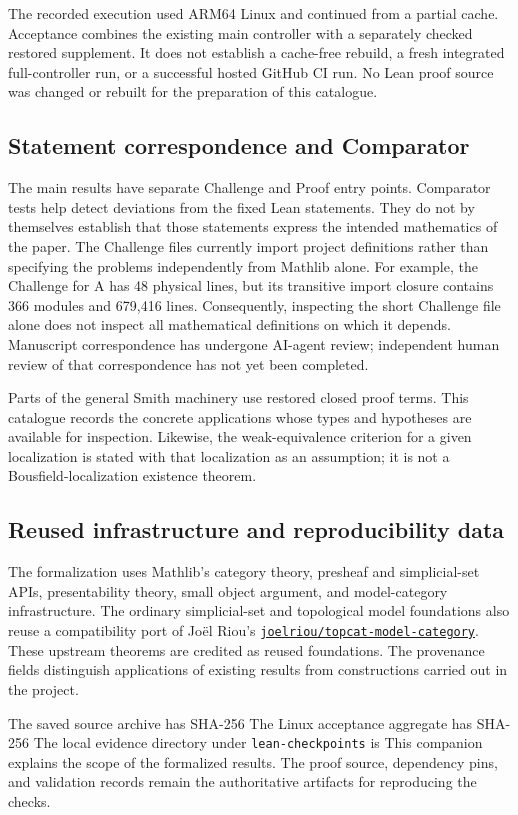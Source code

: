 The recorded execution used ARM64 Linux and continued from a partial cache.
Acceptance combines the existing main controller with a separately checked restored supplement.
It does not establish a cache-free rebuild, a fresh integrated full-controller run, or a successful hosted GitHub CI run.
No Lean proof source was changed or rebuilt for the preparation of this catalogue.

\subsection{Statement correspondence and Comparator}
The main results have separate Challenge and Proof entry points.
Comparator tests help detect deviations from the fixed Lean statements.
They do not by themselves establish that those statements express the intended mathematics of the paper.
The Challenge files currently import project definitions rather than specifying the problems independently from Mathlib alone.
For example, the Challenge for A has 48 physical lines, but its transitive import closure contains 366 modules and 679,416 lines.
Consequently, inspecting the short Challenge file alone does not inspect all mathematical definitions on which it depends.
Manuscript correspondence has undergone AI-agent review; independent human review of that correspondence has not yet been completed.

Parts of the general Smith machinery use restored closed proof terms.
This catalogue records the concrete applications whose types and hypotheses are available for inspection.
Likewise, the weak-equivalence criterion for a given localization is stated with that localization as an assumption; it is not a Bousfield-localization existence theorem.

\subsection{Reused infrastructure and reproducibility data}
The formalization uses Mathlib's category theory, presheaf and simplicial-set APIs, presentability theory, small object argument, and model-category infrastructure.
The ordinary simplicial-set and topological model foundations also reuse a compatibility port of Joël Riou's
\href{https://github.com/joelriou/topcat-model-category}{\texttt{joelriou/topcat-model-category}}.
These upstream theorems are credited as reused foundations.
The provenance fields distinguish applications of existing results from constructions carried out in the project.

The saved source archive has SHA-256
The Linux acceptance aggregate has SHA-256
The local evidence directory under \texttt{lean-checkpoints} is
This companion explains the scope of the formalized results.
The proof source, dependency pins, and validation records remain the authoritative artifacts for reproducing the checks.

